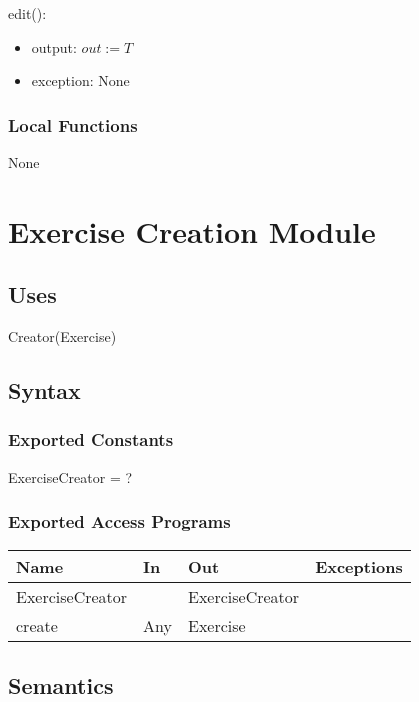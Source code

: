 \documentclass[12pt, titlepage]{article}
\begin{document}
\noindent edit():
\begin{itemize}
	\item output: $out := T$
	\item exception: None
\end{itemize}

\subsubsection{Local Functions}

None

\newpage
\section{Exercise Creation Module}

\subsection{Uses}

Creator(Exercise)

\subsection{Syntax}

\subsubsection{Exported Constants}

ExerciseCreator = ?

\subsubsection{Exported Access Programs}

\begin{center}
	\begin{tabular}{p{2cm} p{4cm} p{4cm} p{2cm}}
		\hline
		\textbf{Name} & \textbf{In} & \textbf{Out} & \textbf{Exceptions} \\
		\hline
		ExerciseCreator &  & ExerciseCreator &  \\
		create & Any & Exercise &  \\
		\hline
	\end{tabular}
\end{center}

\subsection{Semantics}
\end{document}

